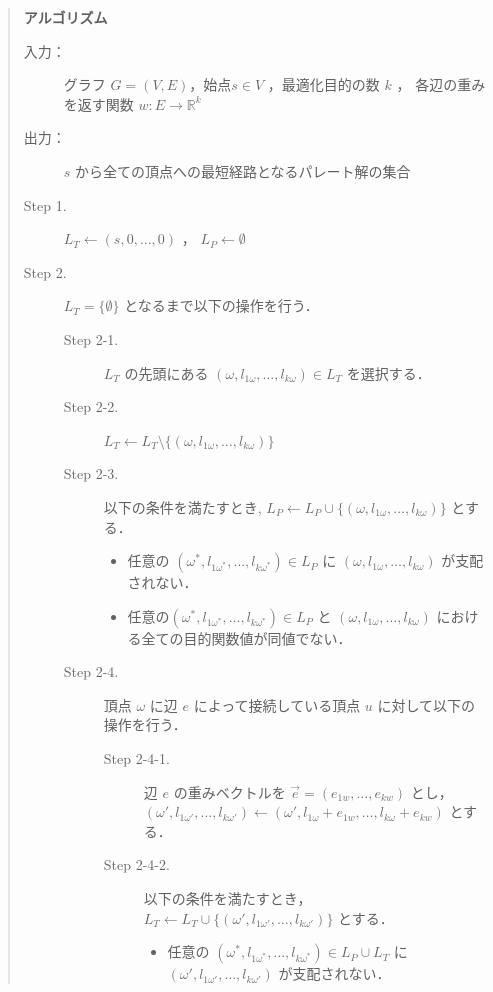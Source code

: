 \documentclass[12pt]{optlab-bachelor}
\begin{document}
\begin{quote}
  \textbf{アルゴリズム}
  \begin{description}
    \item[入力：] グラフ $G=(V,E)$，始点$s \in V$ ，最適化目的の数 $k$ ，
    各辺の重みを返す関数 $w : E \to \mathbb{R}^k$
    \item[出力：] $s$ から全ての頂点への最短経路となるパレート解の集合
    \item[Step 1.] $L_T \leftarrow (s,0,\ldots,0)$ ，
    $L_P \leftarrow \emptyset$
    \item[Step 2.] $L_T = \{\emptyset\}$ となるまで以下の操作を行う．
    \begin{description}
      \item[Step 2-1.] $L_T$ の先頭にある
      $(\omega,l_{1\omega},\ldots,l_{k\omega})\in L_T$ を選択する．
      \item[Step 2-2.] $L_T \leftarrow L_T \setminus
      \{ (\omega,l_{1\omega},\ldots,l_{k\omega}) \}$
      \item[Step 2-3.] 以下の条件を満たすとき,
      $L_P \leftarrow L_P \cup \{(\omega,l_{1\omega},\ldots,l_{k\omega})\}$ とする．
      \begin{itemize}
        \item 任意の $(\omega^*,l_{1\omega^*},\ldots,l_{k\omega^*})\in L_P$ に
        $(\omega,l_{1\omega},\ldots,l_{k\omega})$ が支配されない．
        \item 任意の$(\omega^*,l_{1\omega^*},\ldots,l_{k\omega^*}) \in L_P$ と
        $(\omega,l_{1\omega},\ldots,l_{k\omega})$ における全ての目的関数値が同値でない．
      \end{itemize}
      \item[Step 2-4.] 頂点 $\omega$ に辺 $e$ によって接続している頂点 $u$
      に対して以下の操作を行う．
      \begin{description}
        \item[Step 2-4-1.] 辺 $e$ の重みベクトルを
        $\vec{e} = (e_{1w},\ldots,e_{kw})$ とし，
        $(\omega',l_{1\omega'},\ldots,l_{k\omega'}) \leftarrow
        (\omega',l_{1\omega}+e_{1w},\ldots,l_{k\omega}+e_{kw})$ とする．
        \item[Step 2-4-2.] 以下の条件を満たすとき，
        $L_T \leftarrow L_T \cup \{(\omega',l_{1\omega'},\ldots,l_{k\omega'})\}$ とする．
        \begin{itemize}
          \item 任意の $(\omega^*,l_{1\omega^*},\ldots,l_{k\omega^*})\in L_P \cup L_T$ に
          $(\omega',l_{1\omega'},\ldots,l_{k\omega'})$ が支配されない．

\end{itemize}
\end{description}
\end{description}
\end{description}
\end{quote}
\end{document}

